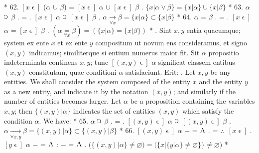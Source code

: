 \documentclass{book}
\newcommand{\C}{\mathop{\sbox0{$\displaystyle$$\reflectbox{C}$} %
\raisebox{-\height+\ht0-0.05cm}[\ht0][\dp0]{\scalebox{0.8}[0.8]{\copy0}}}\displaylimits} %
\newcommand{\pppNoSpace}{\leavevmode\lower0ex\hbox{.}\kern-0.1em\raise0.7ex\hbox{.}\kern-0.1em\lower0ex\hbox{.}} %
\newcommand{\abs}{\mathop{\rotatebox[origin=c]{180}{V}}}
\newcommand{\smallIn}{\ensuremath{\mathrel{\epsilon}}}
\newenvironment{translateTwoCol}
               { %
                 \columnratio{0.5, 0.5} \begin{paracol}{2}
                 \newcommand{\LAT}{\switchcolumn[0]*}
                 \newcommand{\ENG}{\switchcolumn[1]}
               }
               { %
                 \let\ENG\undefined
                 \let\LAT\undefined
                 \end{paracol}
               }
\begin{document}
\begin{translateTwoCol}
\LAT
62. \hspace{0.67cm} $[x\smallIn]$ ($\alpha$ $\cup$ $\beta$) = $[x\smallIn]$ $\alpha$ $\cup$ $[x\smallIn]$ $\beta$
\ENG
62. \hspace{0.67cm} $\{ x | \alpha \vee \beta \} = \{ x | \alpha \} \cup \{ x | \beta \}$
\LAT
63. \hspace{0.67cm} $\alpha$ $\C$\scalebox{0.7}{$x$} $\beta$ . = . $[x\smallIn]$ $\alpha$  $\C$ $[x\smallIn]$ $\beta$
\ENG
63. \hspace{0.67cm} $\alpha \xrightarrow[\forall x]{} \beta = \{x | \alpha\} \subset \{x | \beta \}$
\LAT
64. \hspace{0.67cm} $\alpha$ =\scalebox{0.7}{$x$} $\beta$ . = . $[x\smallIn]$ $\alpha$ = $[x\smallIn]$ $\beta$
\ENG
64. \hspace{0.67cm} $(\alpha \underset{\forall x}= \beta) = (\{ x |  \alpha\} = \{x | \beta \} )$
\LAT
{}. Sint $x,y$ entia quacumque; system ex ente $x$ et ex ente $y$ compositum ut novum ens consideramus, et signo $(x,y)$ indicamus; similiterque si entium numerus maior fit. Sit $\alpha$ propositio indeterminata continens $x,y$; tunc $[(x,y)\smallIn]$ $\alpha$ significat classem entibus $(x,y)$ constitutam, quae conditioni $\alpha$ satisfaciunt. Erit:
\ENG
{}. Let $x,y$ be any entities. We shall consider the system composed of the entity $x$ and the entity $y$ as a new entity, and indicate it by the notation $(x,y)$; and similarly if the number of entities becomes larger. Let $\alpha$ be a proposition containing the variables $x,y$; then $\{(x,y) | \alpha \}$ indicates the set of entities $(x,y)$ which satisfy the condition $\alpha$. We have:   %
\LAT
65. \hspace{0.67cm} $\alpha$ $\C$\scalebox{0.7}{$x, y$} $\beta$ . = . $[(x, y)\smallIn]$ $\alpha$  $\C$ $[(x, y)\smallIn]$ $\beta$
\ENG
65. \hspace{0.67cm} $\alpha \xrightarrow[\forall x,y]{} \beta = \{(x,y) | \alpha\} \subset \{(x,y) | \beta \}$
\LAT
66. \hspace{0.67cm} $[(x, y)\smallIn]$ $\alpha$ $-$ = $\abs$ . = $\pppNoSpace$ $[x\smallIn]$ . $[y\smallIn]$ $\alpha$ $-$ = $\abs$ : $-$ = $\abs$
\ENG
66. \hspace{0.67cm} $\big( \{ (x,y) | \alpha \} \neq \varnothing \big) = \big( \{ x | \{ y | \alpha \} \neq \varnothing \} \} \neq \varnothing \big)$   %
\LAT

\end{translateTwoCol}
\end{document}
